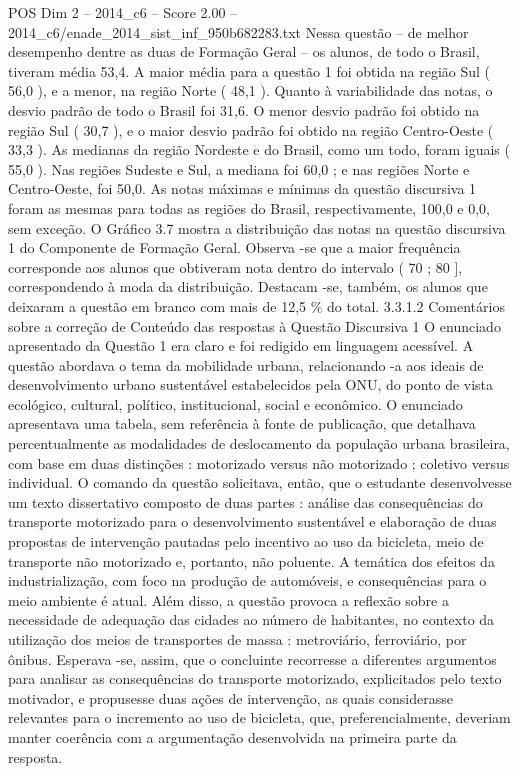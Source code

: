 \begin{textsample}{POS Dim 2 – 2014\_c6 – Score 2.00 – 2014\_c6/enade\_2014\_sist\_inf\_950b682283.txt}
Nessa questão – de melhor desempenho dentre as duas de Formação Geral – os alunos, de todo o Brasil, tiveram média 53,4.
A maior média para a questão 1 foi obtida na região Sul ( 56,0 ), e a menor, na região Norte ( 48,1 ).
Quanto à variabilidade das notas, o desvio padrão de todo o Brasil foi 31,6.
O menor desvio padrão foi obtido na região Sul ( 30,7 ), e o maior desvio padrão foi obtido na região Centro-Oeste ( 33,3 ).
As medianas da região Nordeste e do Brasil, como um todo, foram iguais ( 55,0 ).
Nas regiões Sudeste e Sul, a mediana foi 60,0 ; e nas regiões Norte e Centro-Oeste, foi 50,0.
As notas máximas e mínimas da questão discursiva 1 foram as mesmas para todas as regiões do Brasil, respectivamente, 100,0 e 0,0, sem exceção.
O Gráfico 3.7 mostra a distribuição das notas na questão discursiva 1 do Componente de Formação Geral.
Observa -se que a maior frequência corresponde aos alunos que obtiveram nota dentro do intervalo ( 70 ; 80 ], correspondendo à moda da distribuição.
Destacam -se, também, os alunos que deixaram a questão em branco com mais de 12,5 \% do total. 3.3.1.2 Comentários sobre a correção de Conteúdo das respostas à Questão Discursiva 1 O enunciado apresentado da Questão 1 era claro e foi redigido em linguagem acessível.
A questão abordava o tema da mobilidade urbana, relacionando -a aos ideais de desenvolvimento urbano sustentável estabelecidos pela ONU, do ponto de vista ecológico, cultural, político, institucional, social e econômico.
O enunciado apresentava uma tabela, sem referência à fonte de publicação, que detalhava percentualmente as modalidades de deslocamento da população urbana brasileira, com base em duas distinções : motorizado versus não motorizado ; coletivo versus individual.
O comando da questão solicitava, então, que o estudante desenvolvesse um texto dissertativo composto de duas partes : análise das consequências do transporte motorizado para o desenvolvimento sustentável e elaboração de duas propostas de intervenção pautadas pelo incentivo ao uso da bicicleta, meio de transporte não motorizado e, portanto, não poluente.
A temática dos efeitos da industrialização, com foco na produção de automóveis, e consequências para o meio ambiente é atual.
Além disso, a questão provoca a reflexão sobre a necessidade de adequação das cidades ao número de habitantes, no contexto da utilização dos meios de transportes de massa : metroviário, ferroviário, por ônibus.
Esperava -se, assim, que o concluinte recorresse a diferentes argumentos para analisar as consequências do transporte motorizado, explicitados pelo texto motivador, e propusesse duas ações de intervenção, as quais considerasse relevantes para o incremento ao uso de bicicleta, que, preferencialmente, deveriam manter coerência com a argumentação desenvolvida na primeira parte da resposta.

\end{textsample}
